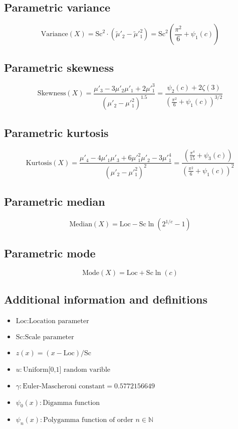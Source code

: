 \documentclass{article}
\begin{document}
\subsection{Parametric variance}
\begin{equation*} \mathrm{Variance}(X)=\text{Sc}^{2}\cdot(\tilde{\mu}'_{2}-\tilde{\mu}'^{2}_{1})=\text{Sc}^{2}\left(\frac{\pi^{2}}{6}+\psi_{1}\left(c\right)\right) \end{equation*}
\subsection{Parametric skewness}
\begin{equation*} \mathrm{Skewness}(X)=\frac{\mu'_{3}-3\mu'_{2}\mu'_{1}+2\mu'^{3}_{1}}{(\mu'_{2}-\mu'^{2}_{1})^{1.5}}=\frac{\psi_{2}\left(c\right)+2\zeta\left(3\right)}{\left(\frac{\pi^{2}}{6}+\psi_{1}\left(c\right)\right)^{3/2}} \end{equation*}
\subsection{Parametric kurtosis}
\begin{equation*} \mathrm{Kurtosis}(X)=\frac{\mu'_{4}-4\mu'_{1}\mu'_{3}+6\mu'^{2}_{1}\mu'_{2}-3\mu'^{4}_{1}}{(\mu'_{2}-\mu'^{2}_{1})^{2}}=\frac{\left(\frac{\pi^{4}}{15}+\psi_{3}\left(c\right)\right)}{\left(\frac{\pi^{2}}{6}+\psi_{1}\left(c\right)\right)^{2}} \end{equation*}
\subsection{Parametric median}
\begin{equation*} \mathrm{Median}(X)=\text{Loc}-\text{Sc}\ln\left(2^{1/c}-1\right) \end{equation*}
\subsection{Parametric mode}
\begin{equation*} \mathrm{Mode}(X)=\text{Loc}+\text{Sc}\ln\left(c\right) \end{equation*}
\subsection{Additional information and definitions}
\begin{itemize}
    \item $ \text{Loc}:\text{Location parameter} $
    \item $ \text{Sc}:\text{Scale parameter} $
    \item $ z\left(x\right)=\left(x-\text{Loc}\right)/\text{Sc} $
    \item $ u:\text{Uniform[0,1] random varible} $
    \item $ \gamma:\text{Euler-Mascheroni constant}=0.5772156649 $
    \item $ \psi_{0}\left(x\right):\text{Digamma function} $
    \item $ \psi_{n}\left(x\right):\text{Polygamma function of order }n\in\mathbb{N} $
\end{itemize}
\end{document}
